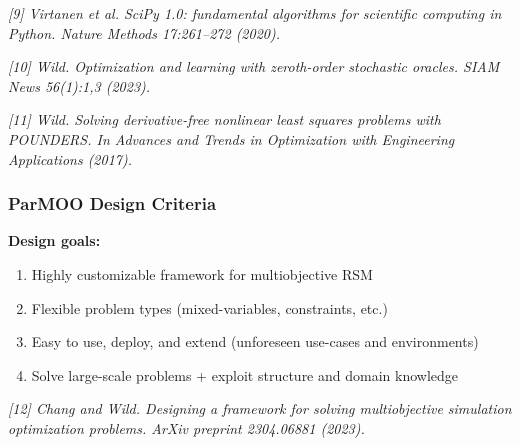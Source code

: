 \documentclass[aspectratio=169]{beamer}
\begin{document}
\begin{frame}
\vfill

{\tiny\it
[9] Virtanen et al.
SciPy 1.0: fundamental algorithms for scientific computing in Python.
{\sl Nature Methods 17:261--272 (2020).}\\
}

\medskip

{\tiny\it
[10] Wild. Optimization and learning with zeroth-order stochastic oracles.
{\sl SIAM News 56(1):1,3 (2023).}\\
}

\medskip

{\tiny\it
[11] Wild.
Solving derivative-free nonlinear least squares problems with POUNDERS.
{\sl In Advances and Trends in Optimization with Engineering Applications
(2017).}\\
}
\end{frame}

\begin{frame}\frametitle{ParMOO Design Criteria}

{\large
\textbf{Design goals:}}

\medskip

\begin{enumerate}
\item Highly customizable framework for multiobjective RSM
\item Flexible problem types (mixed-variables, constraints, etc.)
\item Easy to use, deploy, and extend (unforeseen use-cases and environments)
\item Solve large-scale problems + exploit structure and domain knowledge
\end{enumerate}

\vfill

{\tiny\it
[12]
Chang and Wild.
Designing a framework for solving multiobjective simulation optimization problems.
ArXiv preprint 2304.06881 (2023).
}
\end{frame}
\end{document}
